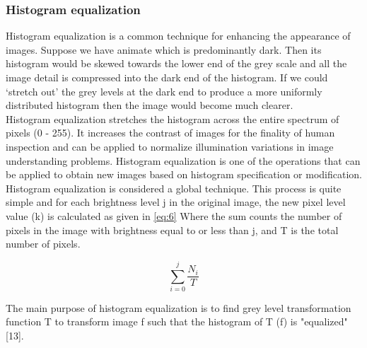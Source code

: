         \vspace{2cm}

\subsubsection{Histogram equalization}
Histogram equalization is a common technique for enhancing the appearance of images.
Suppose we have animate which is predominantly dark. Then its histogram would be skewed
towards the lower end of the grey scale and all the image detail is compressed into the
dark end of the histogram. If we could `stretch out' the grey levels at the dark end to
produce a more uniformly distributed histogram then the image would become much clearer.\\
Histogram equalization stretches the histogram across the entire spectrum of pixels (0 - 255).
It increases the contrast of images for the finality of human inspection and can be applied
to normalize illumination variations in image understanding problems. Histogram equalization
is one of the operations that can be applied to obtain new images based on histogram specification
or modification. Histogram equalization is considered a global technique. This process is quite
simple and for each brightness level j in the original image, the new pixel level value (k)
is calculated as given in \ref{eq:6} Where the sum counts the number of pixels in the image with
brightness equal to or less than j, and T is the total number of pixels.

        \begin{equation}
                \sum_{i = 0}^{j} \frac{N_i}{T}\label{eq:6}
        \end{equation}

The main purpose of histogram equalization is to find grey level transformation function T
to transform image f such that the histogram of T (f) is "equalized" [13].

